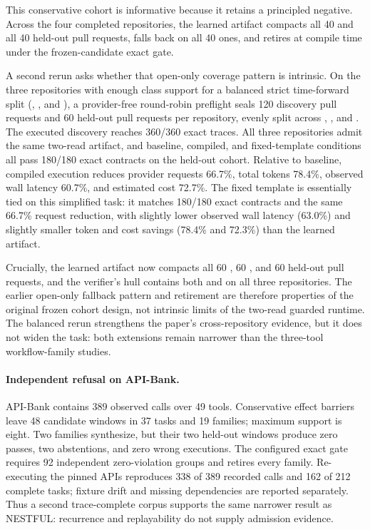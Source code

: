 This conservative cohort is informative because it retains a principled negative.
Across the four completed repositories, the learned artifact compacts all 40
 and all 40  held-out pull requests, falls back on
all 40  ones, and  retires at compile time under the
frozen-candidate exact gate.

A second rerun asks whether that open-only coverage pattern is intrinsic.  On the three
repositories with enough class support for a balanced strict time-forward split
(, , and ), a
provider-free round-robin preflight seals 120 discovery pull requests and 60 held-out
pull requests per repository, evenly split across , , and
.  The executed discovery reaches 360/360 exact traces.  All
three repositories admit the same two-read artifact, and baseline, compiled, and
fixed-template conditions all pass 180/180 exact contracts on the held-out cohort.
Relative to baseline, compiled execution reduces provider requests 66.7\%, total tokens
78.4\%, observed wall latency 60.7\%, and estimated cost 72.7\%.  The fixed template is
essentially tied on this simplified task: it matches 180/180 exact contracts and the
same 66.7\% request reduction, with slightly lower observed wall latency (63.0\%) and
slightly smaller token and cost savings (78.4\% and 72.3\%) than the learned artifact.

Crucially, the learned artifact now compacts all 60 , 60 , and
60  held-out pull requests, and the verifier's 
hull contains both  and  on all three repositories.  The earlier
open-only fallback pattern and  retirement are therefore
properties of the original frozen cohort design, not intrinsic limits of the two-read
guarded runtime.  The balanced rerun strengthens the paper's cross-repository evidence,
but it does not widen the task: both extensions remain narrower than the three-tool
workflow-family studies.

\paragraph{Independent refusal on API-Bank.}
API-Bank contains 389 observed calls over 49 tools. Conservative effect barriers leave 48
candidate windows in 37 tasks and 19 families; maximum support is eight. Two families
synthesize, but their two held-out windows produce zero passes, two abstentions, and zero
wrong executions. The configured exact gate requires 92 independent zero-violation groups
and retires every family. Re-executing the pinned APIs reproduces 338 of 389 recorded calls
and 162 of 212 complete tasks; fixture drift and missing dependencies are reported
separately. Thus a second trace-complete corpus supports the same narrower result as
NESTFUL: recurrence and replayability do not supply admission evidence.

